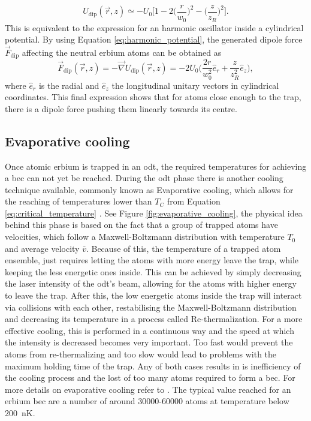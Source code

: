 \begin{equation}\label{eq:harmonic_potential}
	U_{\text{dip}}(\vec{r}, z) \simeq  -U_0 \bigg[1-2\bigg(\frac{r}{w_0}\bigg)^2-\bigg(\frac{z}{z_R}\bigg)^2\bigg].
\end{equation}
This is equivalent to the expression for an harmonic oscillator inside a cylindrical potential. By using Equation \eqref{eq:harmonic_potential}, the generated dipole force $\vec{F}_{\text{dip}}$ affecting the neutral erbium atoms can be obtained as
\begin{equation}
	\vec{F}_{\text{dip}}(\vec{r}, z) = -\vec{\nabla}{U_{\text{dip}}(\vec{r}, z)}= -2U_0\bigg(\frac{2 r}{w_0^2}\hat{e}_r + \frac{z}{z_R^2}\hat{e}_z\bigg),
\end{equation}
where $\hat{e}_r$ is the radial and $\hat{e}_z$ the longitudinal unitary vectors in cylindrical coordinates. This final expression shows that for atoms close enough to the trap, there is a dipole force pushing them linearly towards its centre.

\subsection{Evaporative cooling}

Once atomic erbium is trapped in an \ac{odt}, the required temperatures for achieving a \ac{bec} can not yet be reached. During the \acl{odt} phase there is another cooling technique available, commonly known as Evaporative cooling, which allows for the reaching of temperatures lower than $T_C$ from Equation \eqref{eq:critical_temperature} \cite{Masuhara1988}. See Figure \ref{fig:evaporative_cooling}, the physical idea behind this phase is based on the fact that a group of trapped atoms have velocities, which follow a Maxwell-Boltzmann distribution with temperature $T_0$ and average velocity $\bar{v}$. Because of this, the temperature of a trapped atom ensemble, just requires letting the atoms with more energy leave the trap, while keeping the less energetic ones inside. This can be achieved by simply decreasing the laser intensity of the \ac{odt}'s beam, allowing for the atoms with higher energy to leave the trap. After this, the low energetic atoms inside the trap will interact via collisions with each other, restabilising the Maxwell-Boltzmann distribution and decreasing its temperature in a process called Re-thermalization. For a more effective cooling, this is performed in a continuous way and the speed at which the intensity is decreased becomes very important. Too fast would prevent the atoms from re-thermalizing and too slow would lead to problems with the maximum holding time of the trap. Any of both cases results in is inefficiency of the cooling process and the lost of too many atoms required to form a \ac{bec}. For more details on evaporative cooling refer to \cite{Ulitzsch2016, Metcalf1999, Roell2016}. The typical value reached for an erbium \ac{bec} are a number of around \num{30000}-\num{60000} atoms at temperature below \SI{200}{\nano\kelvin}.


